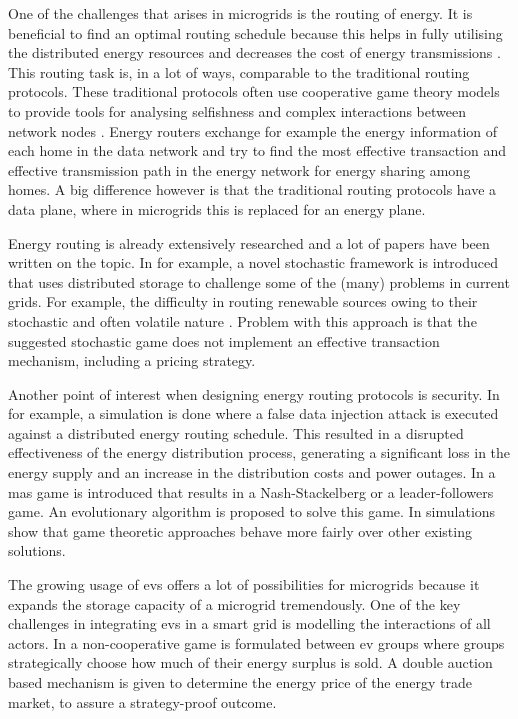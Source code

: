 One of the challenges that arises in microgrids is the routing of energy. It is beneficial to find an optimal routing schedule because this helps in fully utilising the distributed energy resources and decreases the cost of energy transmissions \cite{HongKim2016}. This routing task is, in a lot of ways, comparable to the traditional routing protocols. These traditional protocols often use cooperative game theory models to provide tools for analysing selfishness and complex interactions between network nodes \cite{PavlidouKoltsidas2008}. Energy routers exchange for example the energy information of each home in the data network and try to find the most effective transaction and effective transmission path in the energy network for energy sharing among homes\cite{YoonKimChang2013}. A big difference however is that the traditional routing protocols have a data plane, where in microgrids this is replaced for an energy plane.

Energy routing is already extensively researched and a lot of papers have been written on the topic. In \cite{BaghaieMoellerKrishnamachari2010} for example, a novel stochastic framework is introduced that uses distributed storage to challenge some of the (many) problems in current grids. For example, the difficulty in routing renewable sources owing to their stochastic and often volatile nature \cite{HongKim2016}. Problem with this approach is that the suggested stochastic game does not implement an effective transaction mechanism, including a pricing strategy. 

Another point of interest when designing energy routing protocols is security. In \cite{LinYuYangEtAl2012} for example, a simulation is done where a false data injection attack is executed against a distributed energy routing schedule. This resulted in a disrupted effectiveness of the energy distribution process, generating a significant loss in the energy supply and an increase in the distribution costs and power outages. In \cite{AhouraiTabandehJahedEtAl2009} a \ac{mas} game is introduced that results in a Nash-Stackelberg or a leader-followers game. An evolutionary algorithm is proposed to solve this game. In \cite{AhouraiTabandehJahedEtAl2009} simulations show that game theoretic approaches behave more fairly over other existing solutions.

The growing usage of \acp{ev} offers a lot of possibilities for microgrids because it expands the storage capacity of a microgrid tremendously. One of the key challenges in integrating \acp{ev} in a smart grid is modelling the interactions of all actors. In \cite{SaadHanPoorEtAl2011} a non-cooperative game is formulated between \ac{ev} groups where groups strategically choose how much of their energy surplus is sold. A double auction based mechanism is given to determine the energy price of the energy trade market, to assure a strategy-proof outcome. 

